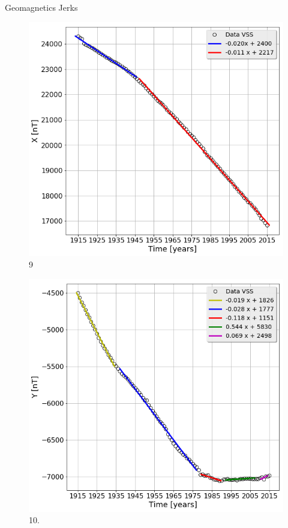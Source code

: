 \documentclass[final,t]{beamer}
\begin{document}
\begin{columns}[t]
\begin{column}{.66\linewidth}
\begin{columns}
\begin{column}{.31\linewidth}
\begin{block}{Geomagnetics Jerks}
		\begin{figure}
\centering
\includegraphics[scale=0.8]{"figs_ed/Linear regression X_v3"}
\caption{9}
\label{fig:LinearregressionX_v2}
\end{figure}
	
		
		\begin{figure}
			\centering
			\includegraphics[scale=0.8]{"figs_ed/Linear regression Y_v3"}
			\caption{10.}
			\label{fintetico}
		\end{figure}	
		

\end{block}
\end{column}
\end{columns}
\end{column}
\end{columns}
\end{document}
